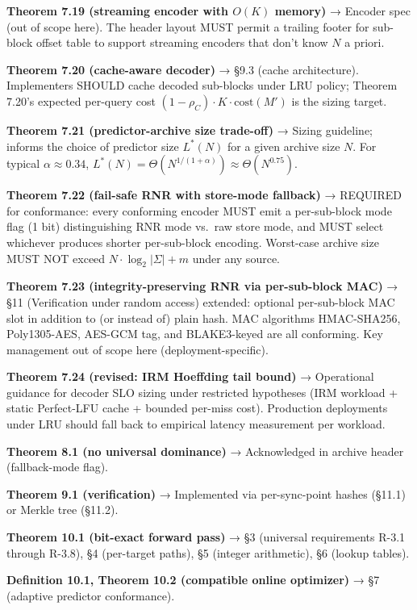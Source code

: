 \documentclass[
]{article}
\begin{document}
\textbf{Theorem 7.19 (streaming encoder with $O(K)$ memory)} →
Encoder spec (out of scope here). The header layout MUST permit a
trailing footer for sub-block offset table to support streaming
encoders that don't know $N$ a priori.

\textbf{Theorem 7.20 (cache-aware decoder)} → §9.3 (cache
architecture). Implementers SHOULD cache decoded sub-blocks under
LRU policy; Theorem 7.20's expected per-query cost
$(1-\rho_C) \cdot K \cdot \mathrm{cost}(M')$ is the sizing target.

\textbf{Theorem 7.21 (predictor-archive size trade-off)} → Sizing
guideline; informs the choice of predictor size $L^\ast(N)$ for a
given archive size $N$. For typical $\alpha \approx 0.34$,
$L^\ast(N) = \Theta(N^{1/(1+\alpha)}) \approx \Theta(N^{0.75})$.

\textbf{Theorem 7.22 (fail-safe RNR with store-mode fallback)} →
REQUIRED for conformance: every conforming encoder MUST emit a
per-sub-block mode flag (1 bit) distinguishing RNR mode vs.\ raw
store mode, and MUST select whichever produces shorter per-sub-block
encoding. Worst-case archive size MUST NOT exceed $N \cdot \log_2 |\Sigma|
+ m$ under any source.

\textbf{Theorem 7.23 (integrity-preserving RNR via per-sub-block MAC)}
→ §11 (Verification under random access) extended: optional
per-sub-block MAC slot in addition to (or instead of) plain hash.
MAC algorithms HMAC-SHA256, Poly1305-AES, AES-GCM tag, and
BLAKE3-keyed are all conforming. Key management out of scope here
(deployment-specific).

\textbf{Theorem 7.24 (revised: IRM Hoeffding tail bound)} →
Operational guidance for decoder SLO sizing under restricted
hypotheses (IRM workload + static Perfect-LFU cache + bounded
per-miss cost). Production deployments under LRU should fall back
to empirical latency measurement per workload.

\textbf{Theorem 8.1 (no universal dominance)} → Acknowledged in archive
header (fallback-mode flag).

\textbf{Theorem 9.1 (verification)} → Implemented via per-sync-point
hashes (§11.1) or Merkle tree (§11.2).

\textbf{Theorem 10.1 (bit-exact forward pass)} → §3 (universal
requirements R-3.1 through R-3.8), §4 (per-target paths), §5 (integer
arithmetic), §6 (lookup tables).

\textbf{Definition 10.1, Theorem 10.2 (compatible online optimizer)} →
§7 (adaptive predictor conformance).
\end{document}

